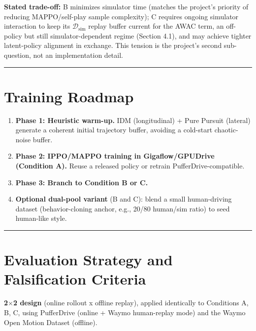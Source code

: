 \documentclass[11pt]{article}
\providecommand{\tightlist}{%
  \setlength{\itemsep}{0pt}\setlength{\parskip}{0pt}}
\begin{document}
\textbf{Stated trade-off:} B minimizes simulator time (matches the project's priority of reducing MAPPO/self-play sample complexity); C requires ongoing simulator interaction to keep its \(\mathcal{D}_{\text{sim}}\) replay buffer current for the AWAC term, an off-policy but still simulator-dependent regime (Section 4.1), and may achieve tighter latent-policy alignment in exchange. This tension is the project's second sub-question, not an implementation detail.

\begin{center}\rule{0.5\linewidth}{0.5pt}\end{center}

\hypertarget{training-roadmap}{%
\section{Training Roadmap}\label{training-roadmap}}

\begin{enumerate}
\def\labelenumi{\arabic{enumi}.}
\tightlist
\item
  \textbf{Phase 1: Heuristic warm-up.} IDM (longitudinal) + Pure Pursuit (lateral) generate a coherent initial trajectory buffer, avoiding a cold-start chaotic-noise buffer.
\item
  \textbf{Phase 2: IPPO/MAPPO training in Gigaflow/GPUDrive (Condition A).} Reuse a released policy or retrain PufferDrive-compatible.
\item
  \textbf{Phase 3: Branch to Condition B or C.}
\item
  \textbf{Optional dual-pool variant} (B and C): blend a small human-driving dataset (behavior-cloning anchor, e.g., 20/80 human/sim ratio) to seed human-like style.
\end{enumerate}

\begin{center}\rule{0.5\linewidth}{0.5pt}\end{center}

\hypertarget{evaluation-strategy-and-falsification-criteria}{%
\section{Evaluation Strategy and Falsification Criteria}\label{evaluation-strategy-and-falsification-criteria}}

\textbf{2$\times$2 design} (online rollout x offline replay), applied identically to Conditions A, B, C, using PufferDrive (online + Waymo human-replay mode) and the Waymo Open Motion Dataset (offline).
\end{document}
